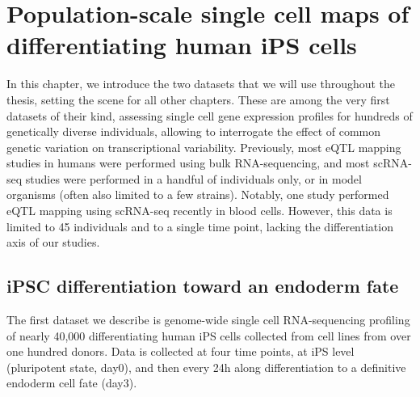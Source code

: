 
\chapter{Population-scale single cell maps of differentiating human iPS cells}

In this chapter, we introduce the two datasets that we will use throughout the thesis, setting the scene for all other chapters. 
These are among the very first datasets of their kind, assessing single cell gene expression profiles for hundreds of genetically diverse individuals, allowing to interrogate the effect of common genetic variation on transcriptional variability.
Previously, most eQTL mapping studies in humans were performed using bulk RNA-sequencing, and most scRNA-seq studies were performed in a handful of individuals only, or in model organisms (often also limited to a few strains).
Notably, one study performed eQTL mapping using scRNA-seq \cite{van2018single} recently in blood cells. 
However, this data is limited to 45 individuals and to a single time point, lacking the differentiation axis of our studies.

\section{iPSC differentiation toward an endoderm fate}

The first dataset we describe is genome-wide single cell RNA-sequencing profiling of nearly 40,000 differentiating human iPS cells collected from cell lines from over one hundred donors. 
Data is collected at four time points, at iPS level (pluripotent state, day0), and then every 24h along differentiation to a definitive endoderm cell fate (day3).

\newpage

